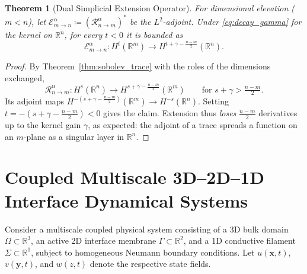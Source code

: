 \documentclass[11pt,a4paper]{article}
\theoremstyle{plain}
\newtheorem{theorem}{Theorem}[section]
\theoremstyle{definition}
\theoremstyle{remark}
\numberwithin{equation}{section}
\begin{document}
\begin{theorem}[Dual Simplicial Extension Operator]
\label{thm:dual_extension}
For dimensional elevation ($m < n$), let $\mathcal{E}_{m \to n}^\alpha \coloneqq (\mathcal{R}_{n \to m}^\alpha)^*$ be the $L^2$-adjoint. Under \eqref{eq:decay_gamma} for the kernel on $\mathbb{R}^n$, for every $t < 0$ it is bounded as
\begin{equation}
\mathcal{E}_{m \to n}^\alpha : H^{t}(\mathbb{R}^m) \longrightarrow H^{t + \gamma - \frac{n-m}{2}}(\mathbb{R}^n).
\end{equation}
\end{theorem}
\begin{proof}
By Theorem~\ref{thm:sobolev_trace} with the roles of the dimensions exchanged,
\[
\mathcal{R}_{n\to m}^\alpha : H^{s}(\mathbb{R}^n) \to H^{s+\gamma-\frac{n-m}{2}}(\mathbb{R}^m) \qquad \text{for } s + \gamma > \tfrac{n-m}{2}.
\]
Its adjoint maps $H^{-(s+\gamma-\frac{n-m}{2})}(\mathbb{R}^m) \to H^{-s}(\mathbb{R}^n)$. Setting $t = -(s + \gamma - \frac{n-m}{2}) < 0$ gives the claim. Extension thus \emph{loses} $\frac{n-m}{2}$ derivatives up to the kernel gain $\gamma$, as expected: the adjoint of a trace spreads a function on an $m$-plane as a singular layer in $\mathbb{R}^n$.
\end{proof}

\section{Coupled Multiscale 3D--2D--1D Interface Dynamical Systems}

Consider a multiscale coupled physical system consisting of a 3D bulk domain $\Omega \subset \mathbb{R}^3$, an active 2D interface membrane $\Gamma \subset \mathbb{R}^2$, and a 1D conductive filament $\Sigma \subset \mathbb{R}^1$, subject to homogeneous Neumann boundary conditions. Let $u(\mathbf{x}, t)$, $v(\mathbf{y}, t)$, and $w(z, t)$ denote the respective state fields.
\end{document}
